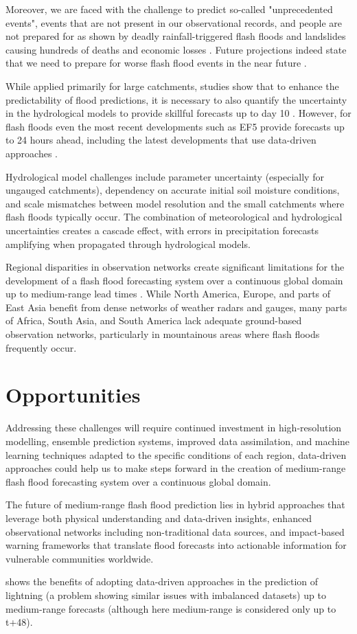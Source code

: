 Moreover, we are faced with the challenge to predict so-called "unprecedented events", events that are not present in our observational records, and people are not prepared for as shown by deadly rainfall-triggered flash floods and landslides causing hundreds of deaths and economic losses \citep{Marengo_2023, Marengo_2024, Alcantara_2023}. Future projections indeed state that we need to prepare for worse flash flood events in the near future \citep{AlRawas_2024a}.

While applied primarily for large catchments, studies show that to enhance the predictability of flood predictions, it is necessary to also quantify the uncertainty in the hydrological models to provide skillful forecasts up to day 10 \citep{Teja_2023}. However, for flash floods even the most recent developments such as EF5 \citep{Flamig_2020} provide forecasts up to 24 hours ahead, including the latest developments that use data-driven approaches \citep{Nevo_2022, Nearing_2024}. 

Hydrological model challenges include parameter uncertainty (especially for ungauged catchments), dependency on accurate initial soil moisture conditions, and scale mismatches between model resolution and the small catchments where flash floods typically occur. The combination of meteorological and hydrological uncertainties creates a cascade effect, with errors in precipitation forecasts amplifying when propagated through hydrological models. 

Regional disparities in observation networks create significant limitations for the development of a flash flood forecasting system over a continuous global domain up to medium-range lead times . While North America, Europe, and parts of East Asia benefit from dense networks of weather radars and gauges, many parts of Africa, South Asia, and South America lack adequate ground-based observation networks, particularly in mountainous areas where flash floods frequently occur. 

\section{Opportunities}

Addressing these challenges will require continued investment in high-resolution modelling, ensemble prediction systems, improved data assimilation, and machine learning techniques adapted to the specific conditions of each region, data-driven approaches could help us to make steps forward in the creation of medium-range flash flood forecasting system over a continuous global domain.

The future of medium-range flash flood prediction lies in hybrid approaches that leverage both physical understanding and data-driven insights, enhanced observational networks including non-traditional data sources, and impact-based warning frameworks that translate flood forecasts into actionable information for vulnerable communities worldwide. 

\citep{Cavaiola_2024} shows the benefits of adopting data-driven approaches in the prediction of lightning (a problem showing similar issues with imbalanced datasets) up to medium-range forecasts (although here medium-range is considered only up to t+48). 
